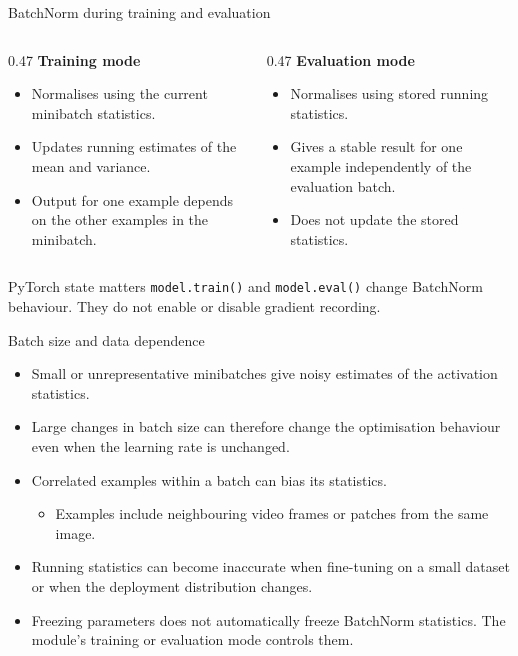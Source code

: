 \begin{frame}{BatchNorm during training and evaluation}
\begin{columns}[T]
\begin{column}{0.47\textwidth}
\textbf{Training mode}
\begin{itemize}
  \item Normalises using the current minibatch statistics.
  \item Updates running estimates of the mean and variance.
  \item Output for one example depends on the other examples in the minibatch.
\end{itemize}
\end{column}
\begin{column}{0.47\textwidth}
\textbf{Evaluation mode}
\begin{itemize}
  \item Normalises using stored running statistics.
  \item Gives a stable result for one example independently of the evaluation batch.
  \item Does not update the stored statistics.
\end{itemize}
\end{column}
\end{columns}

\begin{block}{PyTorch state matters}
\texttt{model.train()} and \texttt{model.eval()} change BatchNorm behaviour. They do not enable or disable gradient recording.
\end{block}
\end{frame}


\begin{frame}{Batch size and data dependence}
\begin{itemize}
  \item Small or unrepresentative minibatches give noisy estimates of the activation statistics.
  \item Large changes in batch size can therefore change the optimisation behaviour even when the learning rate is unchanged.
  \item Correlated examples within a batch can bias its statistics.
  \begin{itemize}
    \item Examples include neighbouring video frames or patches from the same image.
  \end{itemize}
  \item Running statistics can become inaccurate when fine-tuning on a small dataset or when the deployment distribution changes.
  \item Freezing parameters does not automatically freeze BatchNorm statistics. The module's training or evaluation mode controls them.
\end{itemize}
\end{frame}

